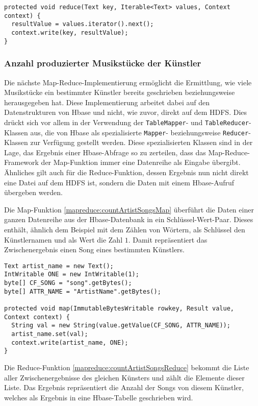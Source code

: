 \begin{lstlisting}[caption={Reduce-Funktion zur Entfernung von mehrfachen Musikeinträgen}, label=mapreduce:strippedReduce]
protected void reduce(Text key, Iterable<Text> values, Context context) {
  resultValue = values.iterator().next();
  context.write(key, resultValue);
}
\end{lstlisting}


\subsubsection{Anzahl produzierter Musikstücke der Künstler}
Die nächste Map-Reduce-Implementierung ermöglicht die Ermittlung, wie viele 
Musikstücke ein bestimmter Künstler bereits geschrieben beziehungsweise herausgegeben
hat. Diese Implementierung arbeitet dabei auf den Datenstrukturen von Hbase und nicht,
wie zuvor, direkt auf dem HDFS. Dies drückt sich vor allem in der Verwendung der 
\texttt{TableMapper}- und \texttt{TableReducer}-Klassen aus, die von Hbase als spezialisierte \texttt{Mapper}- beziehungsweise \texttt{Reducer}-Klassen zur Verfügung gestellt werden.
Diese spezialisierten Klassen sind in der Lage, das Ergebnis einer Hbase-Abfrage so zu
zerteilen, dass das Map-Reduce-Framework der Map-Funktion immer eine Datenreihe 
als Eingabe übergibt. Ähnliches gilt auch für die Reduce-Funktion, dessen Ergebnis
nun nicht direkt eine Datei auf dem HDFS ist, sondern die Daten mit einem Hbase-Aufruf übergeben
werden.

Die Map-Funktion \ref{mapreduce:countArtistSongsMap} überführt die Daten einer ganzen
Datenreihe aus der Hbase-Datenbank in ein Schlüssel-Wert-Paar. Dieses enthält, ähnlich 
dem Beispiel mit dem Zählen von Wörtern, als Schlüssel den Künstlernamen und als Wert
die Zahl $1$. Damit repräsentiert das Zwischenergebnis einen Song eines bestimmten Künstlers.

\begin{lstlisting}[caption={Map-Funktion zur Anzahl der Musikstücke pro Künstler}, label=mapreduce:countArtistSongsMap]
Text artist_name = new Text();
IntWritable ONE = new IntWritable(1);
byte[] CF_SONG = "song".getBytes();
byte[] ATTR_NAME = "ArtistName".getBytes();

protected void map(ImmutableBytesWritable rowkey, Result value, Context context) {
  String val = new String(value.getValue(CF_SONG, ATTR_NAME));
  artist_name.set(val);
  context.write(artist_name, ONE);
}
\end{lstlisting}

Die Reduce-Funktion \ref{mapreduce:countArtistSongsReduce} bekommt die Liste aller
Zwischenergebnisse des gleichen Künsters und zählt die Elemente dieser Liste. Das Ergebnis
repräsentiert die Anzahl der Songs von diesem Künstler, welches als Ergebnis in eine 
Hbase-Tabelle geschrieben wird.

